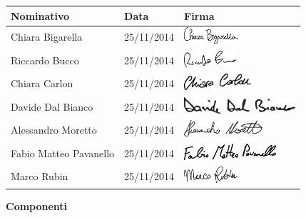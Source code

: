 	\begin{center}
	\begin{tabu} to \textwidth {|X[4]|X[2c]|X[5]|}
	\hline
     Nominativo & Data & Firma \\ \hline
     Chiara Bigarella & 25/11/2014 & \includegraphics[height=6mm]{Commons/Pics/Signatures/Bigarella.pdf}  \\ \hline
     Riccardo Bucco & 25/11/2014 & \includegraphics[height=6mm]{Commons/Pics/Signatures/Bucco.pdf}\\ \hline
     Chiara Carlon & 25/11/2014 & \includegraphics[height=6mm]{Commons/Pics/Signatures/Carlon.pdf}\\ \hline
     Davide Dal Bianco & 25/11/2014 &\includegraphics[height=6mm]{Commons/Pics/Signatures/DalBianco.pdf} \\ \hline
     Alessandro Moretto & 25/11/2014 &\includegraphics[height=6mm]{Commons/Pics/Signatures/Moretto.pdf} \\ \hline
     Fabio Matteo Pavanello & 25/11/2014 & \includegraphics[height=6mm]{Commons/Pics/Signatures/Pavanello.pdf}\\ \hline
     Marco Rubin & 25/11/2014 & \includegraphics[height=6mm]{Commons/Pics/Signatures/Rubin.pdf} \\ \hline
     \end{tabu}
	\end{center}
	\textbf{Componenti}
